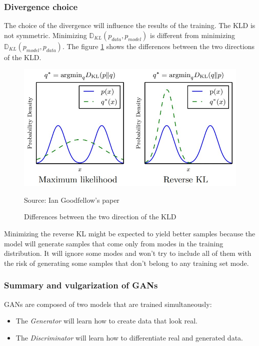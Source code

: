 \documentclass[12pt]{report}
\begin{document}
\subsubsection{Divergence choice}

The choice of the divergence will influence the results of the training.
The KLD is not symmetric.
Minimizing $\mathbb{D}_{KL}(p_{data}, p_{model})$ is different from minimizing $\mathbb{D}_{KL}(p_{model}, p_{data})$.
The figure \ref{fig:gan:directions-kld} shows the differences between the two directions of the KLD.
\begin{figure}[htbp]
    \centering
    \includegraphics[width=\textwidth]{images/nn/graphs/reverse-kl.jpg}
    \caption{Differences between the two direction of the KLD}
    Source: Ian Goodfellow's paper \cite{goodfellow_nips_2017}
    \label{fig:gan:directions-kld}
\end{figure}
Minimizing the reverse KL might be expected to yield better samples because the model will generate samples that come only from modes in the training distribution.
It will ignore some modes and won't try to include all of them with the risk of generating some samples that don't belong to any training set mode.

\subsubsection{Summary and vulgarization of GANs}

GANs are composed of two models that are trained simultaneously:
\begin{itemize}
    \item The \textit{Generator} will learn how to create data that look real.
    \item The \textit{Discriminator} will learn how to differentiate real and generated data.
\end{itemize}
\end{document}

